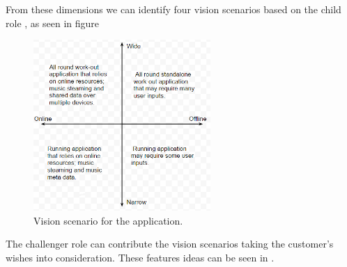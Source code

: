 
From these dimensions we can identify four vision scenarios based on the child role  \cite[ pp. 132-134]{essence}, as seen in figure 

\begin{figure}[h!]
  \centering
    \includegraphics[width=0.6\textwidth]{Images/axis1.PNG}
    \caption{Vision scenario for the application.}
    \label{fig:axis1}
\end{figure}


The challenger role can contribute the vision scenarios taking the customer's wishes into consideration. These features ideas can be seen in .

